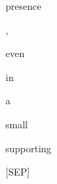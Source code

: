 \documentclass[varwidth=150mm]{standalone}
\begin{document}
\begin{CJK*}{UTF8}{gbsn}
{{{\colorbox{red!2.551030158996582}{\strut presence} \colorbox{red!0.0}{\strut ,} \colorbox{red!1.631904125213623}{\strut even} \colorbox{red!9.005126953125}{\strut in} \colorbox{red!0.0}{\strut a} \colorbox{red!1.7099040746688843}{\strut small} \colorbox{red!100.0}{\strut supporting} \colorbox{red!4.0232744216918945}{\strut [SEP]}
}}}
\end{CJK*}
\end{document}
